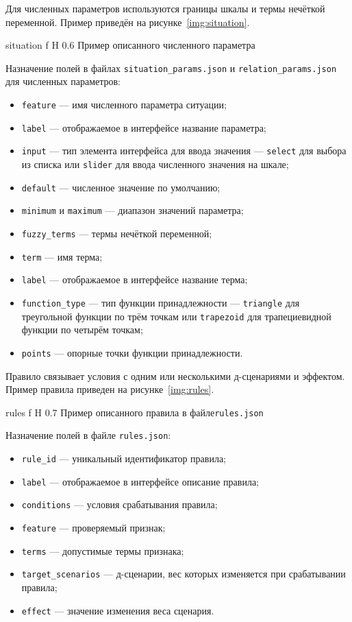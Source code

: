 Для численных параметров используются границы шкалы и термы нечёткой переменной.
Пример приведён на рисунке~\ref{img:situation}.

{situation}
{f}
{H}
{0.6\textwidth}
{Пример описанного численного параметра}

Назначение полей в файлах \texttt{situation\_params.json} и \texttt{relation\_params.json} для численных параметров:
\begin{itemize}
	\item \texttt{feature} --- имя численного параметра ситуации;
	\item \texttt{label} --- отображаемое в интерфейсе название параметра;
	\item \texttt{input} --- тип элемента интерфейса для ввода значения ---
	\texttt{select} для выбора из списка или \texttt{slider} для ввода
	численного значения на шкале;
	\item \texttt{default} --- численное значение по умолчанию;
	\item \texttt{minimum} и \texttt{maximum} --- диапазон значений параметра;
	\item \texttt{fuzzy\_terms} --- термы нечёткой переменной;
	\item \texttt{term} --- имя терма;
	\item \texttt{label} --- отображаемое в интерфейсе название терма;
	\item \texttt{function\_type} --- тип функции принадлежности ---
	\texttt{triangle} для треугольной функции по трём точкам или
	\texttt{trapezoid} для трапециевидной функции по четырём точкам;
	\item \texttt{points} --- опорные точки функции принадлежности.
\end{itemize}

Правило связывает условия с одним или несколькими д-сценариями и эффектом.
Пример правила приведен на рисунке~\ref{img:rules}.

{rules}
{f}
{H}
{0.7\textwidth}
{Пример описанного правила в файле\texttt{rules.json}}

Назначение полей в файле \texttt{rules.json}:
\begin{itemize}
	\item \texttt{rule\_id} --- уникальный идентификатор правила;
	\item \texttt{label} --- отображаемое в интерфейсе описание правила;
	\item \texttt{conditions} --- условия срабатывания правила;
	\item \texttt{feature} --- проверяемый признак;
	\item \texttt{terms} --- допустимые термы признака;
	\item \texttt{target\_scenarios} --- д-сценарии, вес которых изменяется при
	срабатывании правила;
	\item \texttt{effect} --- значение изменения веса сценария.
\end{itemize}

